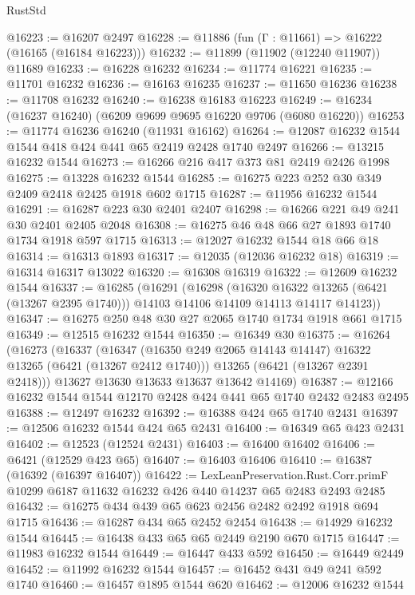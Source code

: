 \begin{lexlean}{RustStd}
\begin{coremodule}
@16223 := @16207 @2497
@16228 := @11886 (fun (Γ : @11661) => @16222 (@16165 (@16184 @16223)))
@16232 := @11899 (@11902 (@12240 @11907)) @11689
@16233 := @16228 @16232
@16234 := @11774 @16221
@16235 := @11701 @16232
@16236 := @16163 @16235
@16237 := @11650 @16236
@16238 := @11708 @16232
@16240 := @16238 @16183 @16223
@16249 := @16234 (@16237 @16240) (@6209 @9699 @9695 @16220 @9706 (@6080 @16220))
@16253 := @11774 @16236 @16240 (@11931 @16162)
@16264 := @12087 @16232 @1544 @1544 @418 @424 @441 @65 @2419 @2428 @1740 @2497
@16266 := @13215 @16232 @1544
@16273 := @16266 @216 @417 @373 @81 @2419 @2426 @1998
@16275 := @13228 @16232 @1544
@16285 := @16275 @223 @252 @30 @349 @2409 @2418 @2425 @1918 @602 @1715
@16287 := @11956 @16232 @1544
@16291 := @16287 @223 @30 @2401 @2407
@16298 := @16266 @221 @49 @241 @30 @2401 @2405 @2048
@16308 := @16275 @46 @48 @66 @27 @1893 @1740 @1734 @1918 @597 @1715
@16313 := @12027 @16232 @1544 @18 @66 @18
@16314 := @16313 @1893
@16317 := @12035 (@12036 @16232 @18)
@16319 := @16314 @16317 @13022
@16320 := @16308 @16319
@16322 := @12609 @16232 @1544
@16337 := @16285
    (@16291
      (@16298
        (@16320 @16322 @13265 (@6421 (@13267 @2395 @1740)))
        @14103
        @14106
        @14109
        @14113
        @14117
        @14123))
@16347 := @16275 @250 @48 @30 @27 @2065 @1740 @1734 @1918 @661 @1715
@16349 := @12515 @16232 @1544
@16350 := @16349 @30
@16375 := @16264
    (@16273
      (@16337
        (@16347 (@16350 @249 @2065 @14143 @14147) @16322 @13265 (@6421 (@13267 @2412 @1740)))
        @13265
        (@6421 (@13267 @2391 @2418)))
      @13627
      @13630
      @13633
      @13637
      @13642
      @14169)
@16387 := @12166 @16232 @1544 @1544 @12170 @2428 @424 @441 @65 @1740 @2432 @2483 @2495
@16388 := @12497 @16232
@16392 := @16388 @424 @65 @1740 @2431
@16397 := @12506 @16232 @1544 @424 @65 @2431
@16400 := @16349 @65 @423 @2431
@16402 := @12523 (@12524 @2431)
@16403 := @16400 @16402
@16406 := @6421 (@12529 @423 @65)
@16407 := @16403 @16406
@16410 := @16387 (@16392 (@16397 @16407))
@16422 := LexLeanPreservation.Rust.Corr.primF
    @10299
    @6187
    @11632
    @16232
    @426
    @440
    @14237
    @65
    @2483
    @2493
    @2485
@16432 := @16275 @434 @439 @65 @623 @2456 @2482 @2492 @1918 @694 @1715
@16436 := @16287 @434 @65 @2452 @2454
@16438 := @14929 @16232 @1544
@16445 := @16438 @433 @65 @65 @2449 @2190 @670 @1715
@16447 := @11983 @16232 @1544
@16449 := @16447 @433 @592
@16450 := @16449 @2449
@16452 := @11992 @16232 @1544
@16457 := @16452 @431 @49 @241 @592 @1740
@16460 := @16457 @1895 @1544 @620
@16462 := @12006 @16232 @1544

\end{coremodule}
\end{lexlean}
